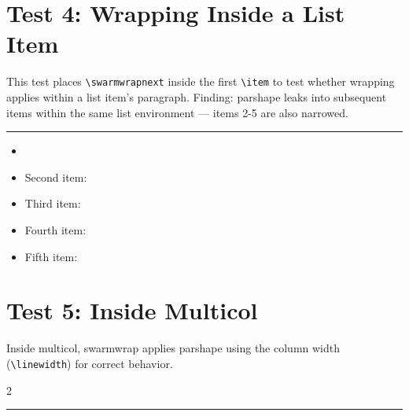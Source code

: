 \documentclass[a4paper,11pt]{article}
\begin{document}
\section*{Test 4: Wrapping Inside a List Item}
This test places \texttt{\textbackslash swarmwrapnext} inside the first
\texttt{\textbackslash item} to test whether wrapping applies within a
list item's paragraph. Finding: parshape leaks into subsequent items
within the same list environment — items 2-5 are also narrowed.

\begin{swarmwrap}%
  \begin{minipage}[t]{3cm}
    \centering
    \rule{\linewidth}{3.8cm}
    \label{fig:inside-itemize}
  \end{minipage}%
\end{swarmwrap}
\begin{itemize}
  \item \swarmwrapnext\lipsum[1]
  \item Second item: \lipsum[2][1-3]
  \item Third item: \lipsum[3][1-3]
  \item Fourth item: \lipsum[4][1-3]
  \item Fifth item: \lipsum[5][1-3]
\end{itemize}

\newpage
\section*{Test 5: Inside Multicol}
Inside multicol, swarmwrap applies parshape using the column width
(\texttt{\textbackslash linewidth}) for correct behavior.

\begin{multicols}{2}
  \begin{swarmwrap}%
    \begin{minipage}[t]{2cm}
      \centering
      \rule{\linewidth}{2.8cm}
      \label{fig:multicol}
    \end{minipage}%
  \end{swarmwrap}%
  \swarmwrapnext
  \lipsum[1-3]
\end{multicols}
\end{document}
